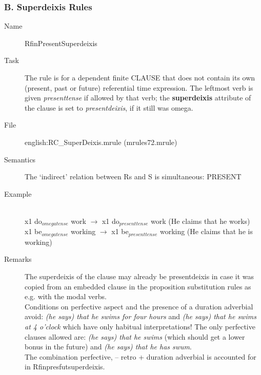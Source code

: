 \begin{description}
\subsubsection{B. Superdeixis Rules}
\begin{description}
\item[Name]   RfinPresentSuperdeixis
\item[Task] The rule is for a dependent finite CLAUSE that does not contain its 
own (present, past or future) referential time expression. 
The leftmost verb is given {\em presenttense\/} if allowed by that verb;
the {\bf superdeixis} attribute of the clause is set to {\em presentdeixis\/}, 
if it still was omega. 
\item[File] english:RC\_SuperDeixis.mrule (mrules72.mrule)
\item[Semantics] The `indirect' relation between Rs and S is simultaneous: 
PRESENT
\item[Example] \mbox{}\\
x1 do$_{omegatense}$ work $\rightarrow$ x1 do$_{presenttense}$ work (He claims 
that he works)\\
x1 be$_{omegatense}$ working $\rightarrow$ x1 be$_{presenttense}$ working (He 
claims that he is working)
\item[Remarks] The superdeixis of the clause may already be  presentdeixis in 
case it was copied from an embedded  clause in the proposition substitution 
rules as e.g. with the modal verbs. \\
Conditions on perfective aspect and the presence of a duration adverbial avoid:
{\em (he says) that he swims for four hours} and {\em (he says) that he swims 
at 4 o'clock} which have only habitual interpretations! The only 
perfective clauses allowed are: {\em (he says) that he swims} (which should get 
a lower bonus in the future) and {\em (he says) that he has swum}.\\
The combination perfective, -- retro + duration adverbial is accounted for in 
Rfinpresfutsuperdeixis.
\end{description}


\end{description}

